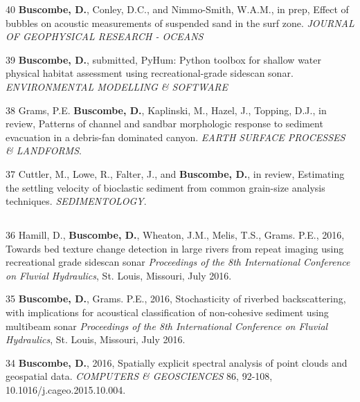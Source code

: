 \documentclass[margin,line]{resume}
\begin{document}
\begin{resume}
\begin{footnotesize}
\begin{list1}
	\item[40] {\bf 	Buscombe, D.}, Conley, D.C., and Nimmo-Smith, W.A.M., in prep, Effect of bubbles on acoustic measurements of suspended sand in the surf zone. {\sl JOURNAL OF GEOPHYSICAL RESEARCH - OCEANS}\\

	\item[39] {\bf Buscombe, D.}, submitted, PyHum: Python toolbox for shallow water physical habitat assessment using recreational-grade sidescan sonar. {\sl ENVIRONMENTAL MODELLING \& SOFTWARE}\\
	
	\item[38] Grams, P.E. {\bf Buscombe, D.}, Kaplinski, M., Hazel, J., Topping, D.J., in review, Patterns of channel and sandbar morphologic response to sediment evacuation in a debris-fan dominated canyon. {\sl EARTH SURFACE PROCESSES \& LANDFORMS}.\\
	
	\item[37] Cuttler, M., Lowe, R., Falter, J., and {\bf Buscombe, D.}, in review, Estimating the settling velocity of bioclastic sediment from common grain-size analysis techniques. {\sl SEDIMENTOLOGY}.
		
	\end{list1}
	
	\subsection{}
	\begin{list1}
	
        \item[36] Hamill, D., {\bf Buscombe, D.}, Wheaton, J.M., Melis, T.S., Grams. P.E., 2016, Towards bed texture change detection in large rivers from repeat imaging using recreational grade sidescan sonar {\sl Proceedings of the 8th International Conference on Fluvial Hydraulics}, St. Louis, Missouri, July 2016.\\
        
        \item[35] {\bf Buscombe, D.}, Grams. P.E., 2016, Stochasticity of riverbed backscattering, with implications for acoustical classification of non-cohesive sediment using multibeam sonar {\sl Proceedings of the 8th International Conference on Fluvial Hydraulics}, St. Louis, Missouri, July 2016.\\

	\item[34] {\bf 	Buscombe, D.}, 2016, Spatially explicit spectral analysis of point clouds and geospatial data. {\sl COMPUTERS \& GEOSCIENCES} 86, 92-108, 10.1016/j.cageo.2015.10.004.


\end{list1}
\end{footnotesize}
\end{resume}
\end{document}
